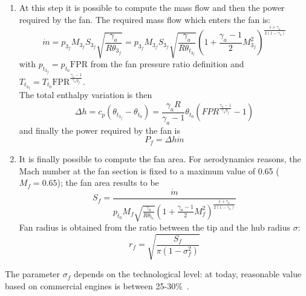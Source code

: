 \begin{enumerate}
	\item At this step it is possible to compute the mass flow and then the power required by the fan. 
	The required mass flow which enters the fan is:
	\begin{equation}
		\label{eq:mass_flow_fan}
		\dot{m}=p_{3_{f}}M_{3_{f}}S_{3_{f}}\sqrt{\frac{\gamma_a}{R\theta_{3_{f}}}}=p_{3_{f}}M_{3_{f}}S_{3_{f}}\sqrt{\frac{\gamma_a}{R\theta_{t_{3_{f}}}}}\left(1+\frac{\gamma_a-1}{2}M_{3_{f}}^2\right)^{\frac{1+\gamma_a}{2(1-\gamma_a)}}
	\end{equation}
	with $p_{t_{3_{f}}}=p_{t_{0}}\mathrm{FPR}$ from the fan pressure ratio definition and $T_{t_{3_{f}}}=T_{t_{0}}\mathrm{FPR}^{\frac{\gamma_a-1}{\gamma_a\eta_f}}$. \\
	
	The total enthalpy variation is then
	\begin{equation}
		\label{eq:delta_h_fan}
		\Delta h = c_p(\theta_{t_{3_{f}}}-\theta_{t_{0}})=\frac{\gamma_a R}{\gamma_a - 1}\theta_{t_{0}}\left(FPR^{\frac{\gamma_a-1}{\gamma_a\eta_f}}-1\right)
	\end{equation}
	and finally the power required by the fan is 
	\begin{equation}
		\label{eq:power_fan_req}
		P_{f}=\Delta h\dot{m}
	\end{equation}	
	
	\item It is finally possible to compute the fan area. 
	For aerodynamics reasons, the Mach number at the fan section is fixed to a maximum value of 0.65 ($M_f=0.65$); the fan area results to be
	\begin{equation}
		\label{eq:fan_area}
		S_{f} = \frac{\dot{m}}{p_{t_{0}}M_{f}\sqrt{\frac{\gamma_a}{R\theta_{t_{0}}}}\left(1+\frac{\gamma_a-1}{2}M_{f}^2\right)^{\frac{1+\gamma_a}{2(1-\gamma_a)}}}
	\end{equation}
	Fan radius is obtained from the ratio between the tip and the hub radius $\sigma$:
	\begin{equation}
		\label{eq:fan_radius}
		r_{f}=\sqrt{\frac{S_{f}}{\pi(1-\sigma_f^2)}}		
	\end{equation}
	
\end{enumerate}

The parameter $\sigma_f$ depends on the technological level: at today, reasonable value based on commercial engines is between 25-30\%~\cite{bib:roux_eng_data}.

